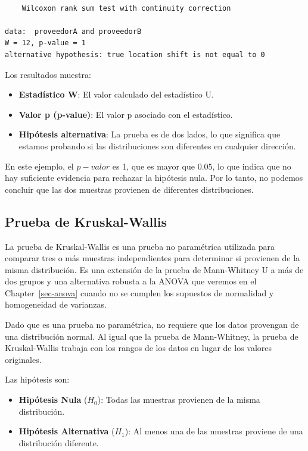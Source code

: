 \documentclass[
  letterpaper,
  DIV=11,
  numbers=noendperiod]{scrreprt}
\providecommand{\tightlist}{%
  \setlength{\itemsep}{0pt}\setlength{\parskip}{0pt}}\usepackage{longtable,booktabs,array}
\begin{document}
\begin{tcolorbox}
\begin{verbatim}

    Wilcoxon rank sum test with continuity correction

data:  proveedorA and proveedorB
W = 12, p-value = 1
alternative hypothesis: true location shift is not equal to 0
\end{verbatim}

Los resultados muestra:

\begin{itemize}
\tightlist
\item
  \textbf{Estadístico W}: El valor calculado del estadístico U.
\item
  \textbf{Valor p (p-value)}: El valor p asociado con el estadístico.
\item
  \textbf{Hipótesis alternativa}: La prueba es de dos lados, lo que
  significa que estamos probando si las distribuciones son diferentes en
  cualquier dirección.
\end{itemize}

En este ejemplo, el \(p-valor\) es 1, que es mayor que \(0.05\), lo que
indica que no hay suficiente evidencia para rechazar la hipótesis nula.
Por lo tanto, no podemos concluir que las dos muestras provienen de
diferentes distribuciones.

\end{tcolorbox}

\hypertarget{prueba-de-kruskal-wallis}{%
\subsection{Prueba de Kruskal-Wallis}\label{prueba-de-kruskal-wallis}}

La prueba de Kruskal-Wallis es una prueba no paramétrica utilizada para
comparar tres o más muestras independientes para determinar si provienen
de la misma distribución. Es una extensión de la prueba de Mann-Whitney
U a más de dos grupos y una alternativa robusta a la ANOVA que veremos
en el Chapter~\ref{sec-anova} cuando no se cumplen los supuestos de
normalidad y homogeneidad de varianzas.

Dado que es una prueba no paramétrica, no requiere que los datos
provengan de una distribución normal. Al igual que la prueba de
Mann-Whitney, la prueba de Kruskal-Wallis trabaja con los rangos de los
datos en lugar de los valores originales.

Las hipótesis son:

\begin{itemize}
\tightlist
\item
  \textbf{Hipótesis Nula} (\(H_0\)): Todas las muestras provienen de la
  misma distribución.
\item
  \textbf{Hipótesis Alternativa} (\(H_1\)): Al menos una de las muestras
  proviene de una distribución diferente.
\end{itemize}
\end{document}
